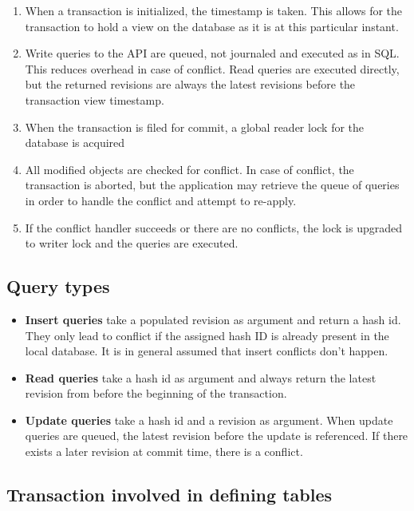 \documentclass{article}
\begin{document}
\begin{enumerate} \itemsep0em
  \item When a transaction is initialized, the timestamp is taken. This allows
    for the transaction to hold a view on the database as it is at this
    particular instant.
  \item Write queries to the API are queued, not journaled and executed as in 
    SQL. This reduces overhead in case of conflict. Read queries are executed
    directly, but the returned revisions are always the latest revisions before
    the transaction view timestamp.
  \item When the transaction is filed for commit, a global reader lock for the
    database is acquired 
  \item All modified objects are checked for conflict. In case of conflict,
    the transaction is aborted, but the application may retrieve the queue of
    queries in order to handle the conflict and attempt to re-apply.
  \item If the conflict handler succeeds or there are no conflicts, the lock
    is upgraded to writer lock and the
    queries are executed.
\end{enumerate}

\subsection{Query types}

\begin{itemize} \itemsep0em
  \item {\bf Insert queries} take a populated revision as argument and return
    a hash id. They only lead to conflict if the assigned hash ID is
    already present in the local database. It is in general assumed that insert
    conflicts don't happen.
  \item {\bf Read queries} take a hash id as argument and
    always return the latest revision from before the
    beginning of the transaction. 
  \item {\bf Update queries} take a hash id and a revision as argument. 
    When update queries are queued, the latest
    revision before the update is referenced. If there exists a later revision 
    at commit time, there is a conflict.
\end{itemize}

\subsection{Transaction involved in defining tables}\label{define-trans}
\end{document}
